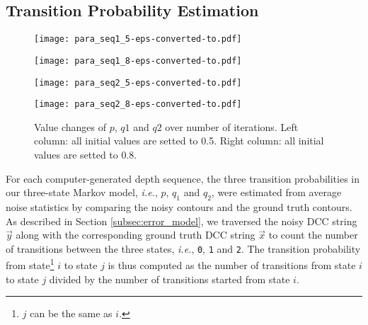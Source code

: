 \subsection{Transition Probability Estimation}
\label{subsec:paraneterEstimation}


\begin{figure}[t]

\begin{minipage}[b]{.48\linewidth}
  \centering
  \centerline{\texttt{[image: para\_seq1\_5-eps-converted-to.pdf]}}
\end{minipage}
\hfill
\begin{minipage}[b]{0.48\linewidth}
  \centering
  \centerline{\texttt{[image: para\_seq1\_8-eps-converted-to.pdf]}}
\end{minipage}
\vfill
\vspace{0.3cm}
\begin{minipage}[b]{.48\linewidth}
  \centering
  \centerline{\texttt{[image: para\_seq2\_5-eps-converted-to.pdf]}}
\end{minipage}
\hfill
\begin{minipage}[b]{0.48\linewidth}
  \centering
  \centerline{\texttt{[image: para\_seq2\_8-eps-converted-to.pdf]}}
\end{minipage}

\caption{Value changes of $p$, $q1$ and $q2$ over number of iterations. Left column: all initial values are setted to 0.5. Right column: all initial values are setted to 0.8.}
\label{fig:parameter_estiamtion}
\end{figure}


For each computer-generated depth sequence, the three transition probabilities in our three-state Markov model, \textit{i.e.}, $p$, $q_1$ and $q_2$, were estimated from average noise statistics by comparing the noisy contours and the ground truth contours.
As described in Section \ref{subsec:error_model}, we traversed the noisy DCC string $\vec{y}$ along with the corresponding ground truth DCC string $\vec{x}$ to count the number of transitions between the three states, \textit{i.e.}, \texttt{0}, \texttt{1} and \texttt{2}.
The transition probability from state\footnote{$j$ can be the same as $i$.} $i$ to state $j$ is thus computed as the number of transitions from state $i$ to state $j$ divided by the number of transitions started from state $i$.


